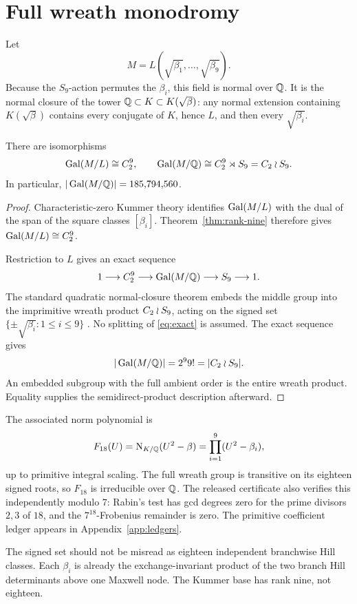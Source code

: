 \section{Full wreath monodromy}

Let
\begin{equation}
 M=L(\sqrt{\beta_1},\ldots,\sqrt{\beta_9}).                 \label{eq:M}
\end{equation}
Because the \(S_9\)-action permutes the \(\beta_i\), this field is normal
over \(\mathbb{Q}\).  It is the normal closure of the tower
\(\mathbb{Q}\subset K\subset K(\sqrt\beta)\): any normal extension containing
\(K(\sqrt\beta)\) contains every conjugate of \(K\), hence \(L\), and
then every \(\sqrt{\beta_i}\).

\begin{theorem}\label{thm:wreath}
There are isomorphisms
\[
 \operatorname{Gal}(M/L)\cong C_2^9,
 \qquad
 \operatorname{Gal}(M/\mathbb{Q})\cong C_2^9\rtimes S_9=C_2\mathbin{\wr} S_9.
\]
In particular, \(|\operatorname{Gal}(M/\mathbb{Q})|=185{,}794{,}560\).
\end{theorem}

\begin{proof}
Characteristic-zero Kummer theory identifies
\(\operatorname{Gal}(M/L)\) with the dual of the span of the square classes
\([\beta_i]\).  Theorem~\ref{thm:rank-nine} therefore gives
\(\operatorname{Gal}(M/L)\cong C_2^9\).

Restriction to \(L\) gives an exact sequence
\[
 1\longrightarrow C_2^9
 \longrightarrow\operatorname{Gal}(M/\mathbb{Q})
 \longrightarrow S_9\longrightarrow1.                     \label{eq:exact}
\]
The standard quadratic normal-closure theorem embeds the middle group into
the imprimitive wreath product \(C_2\mathbin{\wr} S_9\), acting on the signed set
\(\{\pm\sqrt{\beta_i}:1\le i\le9\}\)
\citep{barquero2023wreath}.  No splitting of \eqref{eq:exact} is assumed.
The exact sequence gives
\[
 |\operatorname{Gal}(M/\mathbb{Q})|=2^9 9!=|C_2\mathbin{\wr} S_9|.
\]
An embedded subgroup with the full ambient order is the entire wreath
product.  Equality supplies the semidirect-product description afterward.
\end{proof}

The associated norm polynomial is
\begin{equation}
 F_{18}(U)=\operatorname{N}_{K/\mathbb{Q}}(U^2-\beta)
          =\prod_{i=1}^{9}(U^2-\beta_i),                   \label{eq:f18}
\end{equation}
up to primitive integral scaling.  The full wreath group is transitive on
its eighteen signed roots, so \(F_{18}\) is irreducible over \(\mathbb{Q}\).  The
released certificate also verifies this independently modulo \(7\): Rabin's
test has gcd degrees zero for the prime divisors \(2,3\) of \(18\), and the
\(7^{18}\)-Frobenius remainder is zero.  The primitive coefficient ledger
appears in Appendix~\ref{app:ledgers}.

The signed set should not be misread as eighteen independent branchwise Hill
classes.  Each \(\beta_i\) is already the exchange-invariant product of the
two branch Hill determinants above one Maxwell node.  The Kummer base has
rank nine, not eighteen.
